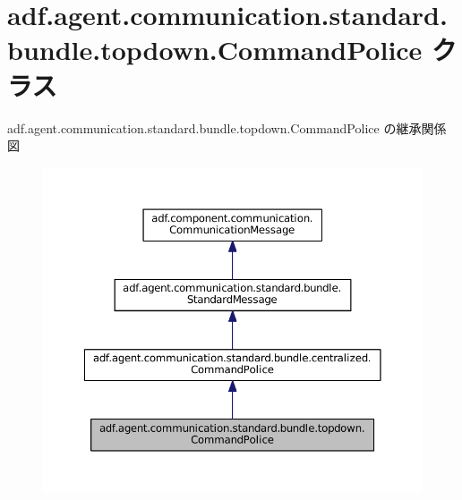 \hypertarget{classadf_1_1agent_1_1communication_1_1standard_1_1bundle_1_1topdown_1_1CommandPolice}{}\section{adf.\+agent.\+communication.\+standard.\+bundle.\+topdown.\+Command\+Police クラス}
\label{classadf_1_1agent_1_1communication_1_1standard_1_1bundle_1_1topdown_1_1CommandPolice}


adf.\+agent.\+communication.\+standard.\+bundle.\+topdown.\+Command\+Police の継承関係図
\nopagebreak
\begin{figure}[H]
\begin{center}
\leavevmode
\includegraphics[width=350pt]{classadf_1_1agent_1_1communication_1_1standard_1_1bundle_1_1topdown_1_1CommandPolice__inherit__graph}
\end{center}
\end{figure}


